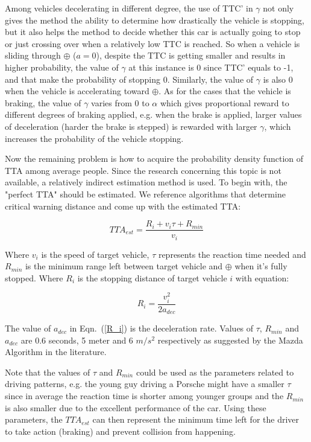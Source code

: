 \documentclass[twocolumn,10pt]{asme2e}
\begin{document}
Among vehicles decelerating in different degree, the use of TTC' in $\gamma$  not only gives the method the ability to determine how drastically the vehicle is stopping, but it also helps the method to decide whether this car is actually going to stop or just crossing over when a relatively low TTC is reached. So when a vehicle is sliding through $\oplus$ ($a = 0$), despite the TTC is getting smaller and results in higher probability, the value of $\gamma$ at this instance is 0 since TTC' equals to -1, and that make the probability of stopping 0. Similarly, the value of $\gamma$ is also 0 when the vehicle is accelerating toward $\oplus$. As for the cases that the vehicle is braking, the value of $\gamma$ varies from 0 to $\alpha$ which gives proportional reward to different degrees of braking applied, e.g. when the brake is applied, larger values of deceleration (harder the brake is stepped) is rewarded with larger $\gamma$, which increases the probability of the vehicle stopping.

Now the remaining problem is how to acquire the probability density function of TTA among average people. Since the research concerning this topic is not available, a relatively indirect estimation method is used. To begin with, the "perfect TTA" should be estimated. We reference algorithms that determine critical warning distance \cite{CWD} and come up with the estimated TTA:

\begin{equation}
TTA_{est} = \frac{R_i+v_i\tau+R_{min}}{v_i} 
\label{TTA_est}
\end{equation}

Where $v_i$ is the speed of target vehicle, $\tau$ represents the reaction time needed and $R_{min}$ is the minimum range left between target vehicle and $\oplus$ when it's fully stopped.
Where $R_i$ is the stopping distance of target vehicle $i$ with equation:
 
\begin{equation}
R_{i} = \frac{v_i^2}{2a_{dec}}
\label{R_i}
\end{equation}

The value of $a_{dec}$ in Eqn.~(\ref{R_i}) is the deceleration rate. Values of $\tau$, $R_{min}$ and $a_{dec}$ are 0.6 seconds, 5 meter and 6 $m/s^2$ respectively as suggested by the Mazda Algorithm in the literature. 

Note that the values of $\tau$ and $R_{min}$ could be used as the parameters related to driving patterns, e.g. the young guy driving a Porsche might have a smaller $\tau$ since in average the reaction time is shorter among younger groups and the $R_{min}$ is also smaller due to the excellent performance of the car. Using these parameters, the $TTA_{est}$ can then represent the minimum time left for the driver to take action (braking) and prevent collision from happening.
\end{document}
